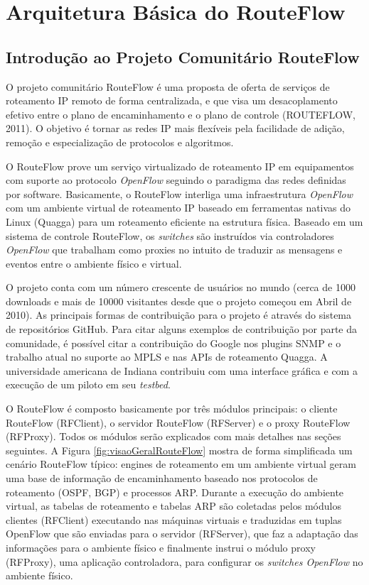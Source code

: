 \chapter{Arquitetura Básica do RouteFlow}

\section{Introdução ao Projeto Comunitário RouteFlow}

O projeto comunitário RouteFlow é uma proposta de oferta de serviços de
roteamento IP remoto de forma centralizada, e que visa um
desacoplamento efetivo entre o plano de encaminhamento e o
plano de controle (ROUTEFLOW, 2011). O objetivo é tornar as
redes IP mais flexíveis pela facilidade de adição,
remoção e especialização de protocolos e algoritmos.


O RouteFlow prove um serviço virtualizado de roteamento IP
em equipamentos com suporte ao protocolo \textit{OpenFlow}
seguindo o paradigma das redes definidas por software.
Basicamente, o RouteFlow interliga uma infraestrutura 
\textit{OpenFlow} com um ambiente virtual de roteamento 
IP baseado em ferramentas nativas do Linux (Quagga) para
um roteamento eficiente na estrutura física. Baseado em um
sistema de controle RouteFlow, os \textit{switches} 
são instruídos via controladores \textit{OpenFlow} que 
trabalham como proxies no intuito de traduzir as mensagens
e eventos entre o ambiente físico e virtual. 

O projeto conta com um número crescente de usuários no 
mundo (cerca de 1000 downloads e mais de 10000 visitantes
desde que o projeto começou em Abril de 2010). As principais
formas de contribuição para o projeto é através do sistema
de repositórios GitHub. Para citar alguns exemplos de contribuição
por parte da comunidade, é possível citar a contribuição
do Google nos plugins SNMP e o trabalho atual no suporte
ao MPLS e nas APIs de roteamento Quagga. A universidade
americana de Indiana contribuiu com uma interface gráfica
e com a execução de um piloto em seu \textit{testbed}.


O RouteFlow é composto basicamente por três módulos principais:
o cliente RouteFlow (RFClient), o servidor RouteFlow (RFServer) e
o proxy RouteFlow (RFProxy). Todos os módulos serão
explicados com mais detalhes nas seções seguintes. A Figura \ref{fig:visaoGeralRouteFlow} mostra
de forma simplificada um cenário RouteFlow típico: engines de 
roteamento em um ambiente virtual geram uma base de 
informação de encaminhamento baseado nos protocolos 
de roteamento (OSPF, BGP) e processos ARP. Durante a 
execução do ambiente virtual, as tabelas de roteamento e 
tabelas ARP são coletadas pelos módulos clientes (RFClient) executando
nas máquinas virtuais e traduzidas em tuplas OpenFlow que
são enviadas para o servidor (RFServer), que faz a adaptação das 
informações para o ambiente físico e finalmente instrui o 
módulo proxy (RFProxy), uma aplicação controladora, para configurar
os \textit{switches OpenFlow} no ambiente físico.


